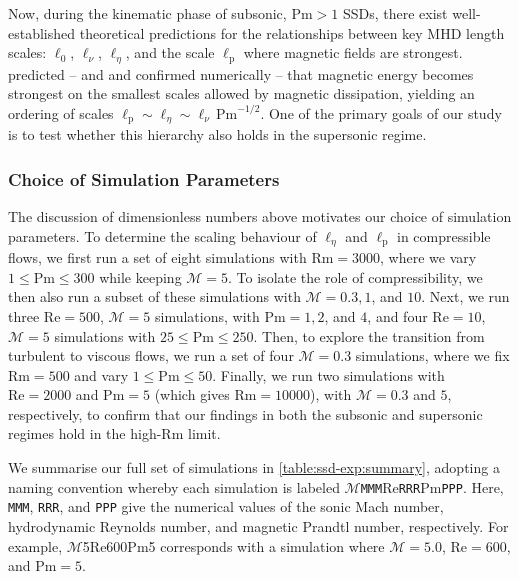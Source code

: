 \documentclass[12pt,twoside]{extreport}
\makeatletter
\newcommand{\mReh}{\ensuremath{\mathrm{Re}}} %
\newcommand{\mRem}{\ensuremath{\mathrm{Rm}}} %
\newcommand{\mPrm}{\ensuremath{\mathrm{Pm}}} %
\newcommand{\mSonicMach}{\ensuremath{\mathcal{M}}} %
\newcommand{\SimName}[3]{$\mSonicMach${#1}$\mReh${#2}$\mPrm${#3}}
\providecommand{\DIFaddtex}[1]{{\protect\color{DIFgreen}\uwave{#1}}} %
\providecommand{\DIFdeltex}[1]{{\protect\color{DIFpurple}\sout{#1}}} %
\providecommand{\DIFaddbegin}{} %
\providecommand{\DIFaddend}{} %
\providecommand{\DIFdelbegin}{} %
\providecommand{\DIFdelend}{} %
\providecommand{\DIFadd}[1]{\texorpdfstring{\DIFaddtex{#1}}{#1}} %
\providecommand{\DIFdel}[1]{\texorpdfstring{\DIFdeltex{#1}}{}} %
\providecommand{\DIFscaledelfig}{0.5}
\newlength{\DIFdelgraphicswidth} %
\newlength{\DIFdelgraphicsheight} %
\providecommand{\DIFaddincludegraphics}[2][]{{\color{DIFgreen}\fbox{\DIFOincludegraphics[#1]{#2}}}} %
\providecommand{\DIFdelincludegraphics}[2][]{%
\sbox{\DIFdelgraphicsbox}{\DIFOincludegraphics[#1]{#2}}%
\settoboxwidth{\DIFdelgraphicswidth}{\DIFdelgraphicsbox} %
\settoboxtotalheight{\DIFdelgraphicsheight}{\DIFdelgraphicsbox} %
\scalebox{\DIFscaledelfig}{%
\parbox[b]{\DIFdelgraphicswidth}{\usebox{\DIFdelgraphicsbox}\\[-\baselineskip] \rule{\DIFdelgraphicswidth}{0em}}\llap{\resizebox{\DIFdelgraphicswidth}{\DIFdelgraphicsheight}{%
\setlength{\unitlength}{\DIFdelgraphicswidth}%
\begin{picture}(1,1)%
\thicklines\linethickness{2pt} %
{\color{DIFpurple}\put(0,0){\framebox(1,1){}}}%
{\color{DIFpurple}\put(0,0){\line( 1,1){1}}}%
{\color{DIFpurple}\put(0,1){\line(1,-1){1}}}%
\end{picture}%
}\hspace*{3pt}}} %
} %
\DeclareRobustCommand{\DIFaddbegin}{\DIFOaddbegin \let\includegraphics\DIFaddincludegraphics} %
\DeclareRobustCommand{\DIFaddend}{\DIFOaddend \let\includegraphics\DIFOincludegraphics} %
\DeclareRobustCommand{\DIFdelbegin}{\DIFOdelbegin \let\includegraphics\DIFdelincludegraphics} %
\DeclareRobustCommand{\DIFdelend}{\DIFOaddend \let\includegraphics\DIFOincludegraphics} %
\let\sout@orig\sout %
\renewcommand{\sout}[1]{\ifmmode\text{\sout@orig{\ensuremath{#1}}}\else\sout@orig{#1}\fi} %
\makeatother
\begin{document}
Now, during the kinematic phase of subsonic, $\mPrm > 1$ SSDs, there exist well-established theoretical predictions for the relationships between key MHD length scales: \DIFdelbegin \DIFdel{$\ell_0$}\DIFdelend \DIFaddbegin \DIFadd{$\ell_\mathrm{turb}$}\DIFaddend , $\ell_\nu$, $\ell_\eta$, and the scale $\ell_\mathrm{p}$ where magnetic fields are strongest. \citet{schekochihin2002spectra, schekochihin2004simulations} predicted -- and  and \citet{brandenburg2023dissipative} confirmed numerically -- that magnetic energy becomes strongest on the smallest scales allowed by magnetic dissipation, yielding an ordering of scales $\ell_\mathrm{p} \sim \ell_\eta \sim \ell_\nu \, \mPrm^{-1/2}$. One of the primary goals of our study is to test whether this hierarchy also holds in the supersonic regime.

\subsubsection{Choice of Simulation Parameters}

The discussion of dimensionless numbers above motivates our choice of simulation parameters. To determine the scaling behaviour of $\ell_\eta$ and $\ell_\mathrm{p}$ in compressible flows, we first run a set of eight simulations with $\mRem = 3000$, where we vary $1 \leq \mPrm \leq 300$ while keeping $\mSonicMach = 5$. To isolate the role of compressibility, we then also run a subset of these simulations with $\mSonicMach = 0.3, 1$, and $10$. Next, we run three $\mReh = 500$, $\mSonicMach = 5$ simulations, with $\mPrm = 1, 2$, and $4$, and four $\mReh = 10$, $\mSonicMach = 5$ simulations with $25 \leq \mPrm \leq 250$. Then, to explore the transition from turbulent to viscous flows, we run a set of four $\mSonicMach = 0.3$ simulations, where we fix $\mRem = 500$ and vary $1 \leq \mPrm \leq 50$. Finally, we run two simulations with $\mReh = 2000$ and $\mPrm = 5$ (which gives $\mRem = 10000$), with $\mSonicMach = 0.3$ and $5$, respectively, to confirm that our findings in both the subsonic and supersonic regimes hold in the high-$\mRem$ limit.

We summarise our full set of simulations in \autoref{table:ssd-exp:summary}, adopting a naming convention whereby each simulation is labeled \SimName{\texttt{MMM}}{\texttt{RRR}}{\texttt{PPP}}. Here, \texttt{MMM}, \texttt{RRR}, and \texttt{PPP} give the numerical values of the sonic Mach number, hydrodynamic Reynolds number, and magnetic Prandtl number, respectively. For example, \SimName{5}{600}{5} corresponds with a simulation where $\mSonicMach = 5.0$, $\mReh=600$, and $\mPrm=5$.
\end{document}
